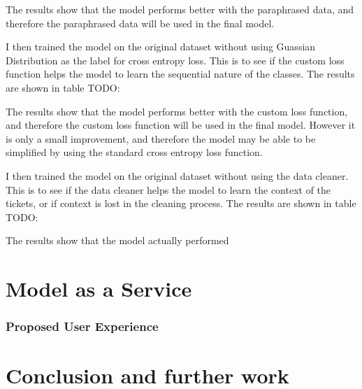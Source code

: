 \documentclass{UoYCSproject}
\begin{document}
    The results show that the model performs better with the paraphrased data, and therefore the paraphrased data will be used in the final model.

    I then trained the model on the original dataset without using Guassian Distribution as the label for cross entropy loss.
    This is to see if the custom loss function helps the model to learn the sequential nature of the classes.
    The results are shown in table TODO: \par

    The results show that the model performs better with the custom loss function, and therefore the custom loss function will be used in the final model.
    However it is only a small improvement, and therefore the model may be able to be simplified by using the standard cross entropy loss function.

    I then trained the model on the original dataset without using the data cleaner.
    This is to see if the data cleaner helps the model to learn the context of the tickets, or if context is lost in the cleaning process.
    The results are shown in table TODO: \par

The results show that the model actually performed







    \chapter{Model as a Service}
    \label{ch:model-as-a-service}
    \subsection[Proposed User Experience]{Proposed User Experience}


    \chapter{Conclusion and further work}
    \label{ch:conclusion}

\printbibliography
\end{document}
